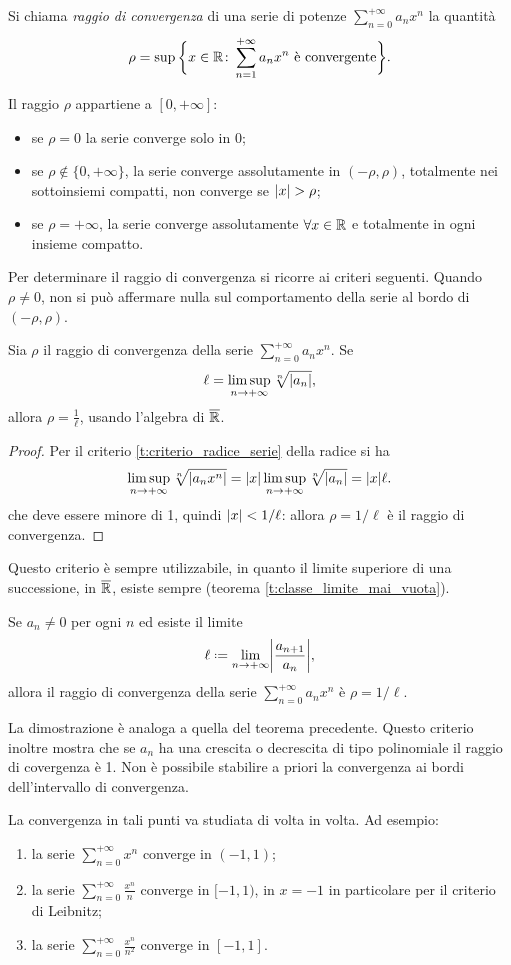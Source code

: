 \begin{definizione}
Si chiama \emph{raggio di convergenza} di una serie di potenze $\sum_{n=0}^{+\infty}a_nx^n$ la quantità
\[
\rho=\sup\bigg\{x\in\mathbb{R}\colon\sum_{n=1}^{+\infty}a_nx^n\text{ è convergente}\bigg\}.
\]
\end{definizione}
Il raggio $\rho$ appartiene a $[0,+\infty]$:
\begin{itemize}
\item se $\rho=0$ la serie converge solo in 0;
\item se $\rho\notin\{0,+\infty\}$, la serie converge assolutamente in $(-\rho,\rho)$, totalmente nei sottoinsiemi compatti, non converge se $\lvert x\rvert>\rho$;
\item se $\rho=+\infty$, la serie converge assolutamente $\forall x\in\mathbb{R}$ e totalmente in ogni insieme compatto.
\end{itemize}
Per determinare il raggio di convergenza si ricorre ai criteri seguenti.
Quando $\rho\neq 0$, non si può affermare nulla sul comportamento della serie al bordo di $(-\rho,\rho)$.
\begin{teorema}
Sia $\rho$ il raggio di convergenza della serie $\sum_{n=0}^{+\infty}a_nx^n$. Se
\[
\ell=\limsup_{n\to+\infty}\sqrt[n]{\lvert a_n\rvert},
\]
allora $\rho=\frac1{\ell}$, usando l'algebra di $\overline{\mathbb{R}}$.
\end{teorema}
\begin{proof}
Per il criterio \ref{t:criterio_radice_serie} della radice si ha
\[
\limsup_{n\to+\infty}\sqrt[n]{\lvert a_nx^n\rvert}=\lvert x\rvert\limsup_{n\to+\infty}\sqrt[n]{\lvert a_n\rvert}=\lvert x\rvert\ell.
\]
che deve essere minore di 1, quindi $\lvert x\rvert<1/\ell$: allora $\rho=1/\ell$ è il raggio di convergenza.
\end{proof}
Questo criterio è sempre utilizzabile, in quanto il limite superiore di una successione, in $\overline{\mathbb{R}}$, esiste sempre (teorema \ref{t:classe_limite_mai_vuota}).
\begin{teorema}
Se $a_n\neq 0$ per ogni $n$ ed esiste il limite
\[
	\ell\defeq\lim_{n\to+\infty}\abs[\bigg]{\frac{a_{n+1}}{a_n}},
\]
allora il raggio di convergenza della serie $\sum_{n=0}^{+\infty}a_nx^n$ è $\rho=1/\ell$.
\end{teorema}
La dimostrazione è analoga a quella del teorema precedente. Questo criterio inoltre mostra che se $a_n$ ha una crescita o decrescita di tipo polinomiale il raggio di covergenza è 1.
Non è possibile stabilire a priori la convergenza ai bordi dell'intervallo di convergenza.
\begin{esempio} \label{es:convergenza-serie-di-potenza-sul-bordo}
	La convergenza in tali punti va studiata di volta in volta. Ad esempio:
	\begin{enumerate}
		\item la serie $\sum_{n=0}^{+\infty}x^n$ converge in $(-1,1)$;
		\item la serie $\sum_{n=0}^{+\infty}\frac{x^n}{n}$ converge in $[-1,1)$, in $x=-1$ in particolare per il criterio di Leibnitz;
		\item la serie $\sum_{n=0}^{+\infty}\frac{x^n}{n^2}$ converge in $[-1,1]$.
	\end{enumerate}
\end{esempio}

